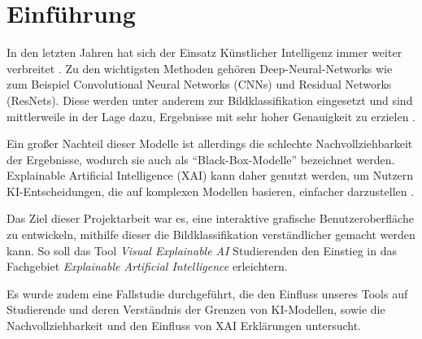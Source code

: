 \chapter{Einführung}
\label{chap:chapter-1}

In den letzten Jahren hat sich der Einsatz Künstlicher Intelligenz immer weiter verbreitet \cite{chatgpt}.
Zu den wichtigsten Methoden gehören Deep-Neural-Networks wie zum Beispiel Convolutional Neural Networks (CNNs) und Residual Networks (ResNets).
Diese werden unter anderem zur Bildklassifikation eingesetzt und sind mittlerweile in der Lage dazu, Ergebnisse mit sehr hoher Genauigkeit zu erzielen \cite{GIUDICI2023101560, he2016resnet, tan2021efficientnetv2}.

Ein großer Nachteil dieser Modelle ist allerdings die schlechte Nachvollziehbarkeit der Ergebnisse, wodurch sie auch als \enquote{Black-Box-Modelle} bezeichnet werden.
Explainable Artificial Intelligence (XAI) kann daher genutzt werden, um Nutzern KI-Entscheidungen, die auf komplexen Modellen basieren, einfacher darzustellen \cite{blackbox}.

Das Ziel dieser Projektarbeit war es, eine interaktive grafische Benutzeroberfläche zu entwickeln, mithilfe dieser die Bildklassifikation verständlicher gemacht werden kann. So soll das Tool \textit{Visual Explainable AI} Studierenden den Einstieg in das Fachgebiet \textit{Explainable Artificial Intelligence} erleichtern.

Es wurde zudem eine Fallstudie durchgeführt, die den Einfluss unseres Tools auf Studierende und deren Verständnis der Grenzen von KI-Modellen, sowie die Nachvollziehbarkeit und den Einfluss von XAI Erklärungen untersucht. \\

